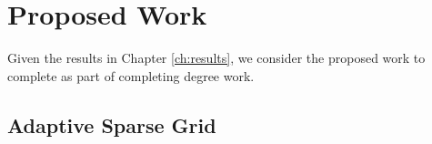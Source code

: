 
\chapter{Proposed Work} %

\label{ch:proposed} %


Given the results in Chapter \ref{ch:results}, we consider the proposed work to complete as part of completing
degree work.

\section{Adaptive Sparse Grid}

